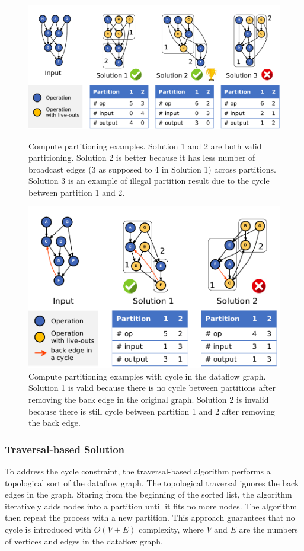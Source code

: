 \begin{figure}
  \centering
  \includegraphics[width=1\columnwidth]{figs/parteg.pdf}
  \caption[Compute partitioning examples]{
    Compute partitioning examples. Solution 1 and 2 are both valid partitioning. Solution 2 is
    better because it has less number of broadcast edges (3 as supposed to 4 in Solution 1) across partitions. 
    Solution 3 is an example
    of illegal partition result due to the cycle between partition 1 and 2.
  }
  \label{fig:parteg}

  \includegraphics[width=0.8\columnwidth]{figs/partcycleeg.pdf}
  \caption[Compute partitioning examples with cycle]{
    Compute partitioning examples with cycle in the dataflow graph.
    Solution 1 is valid because there is no 
    cycle between partitions after removing the back edge in
    the original graph.
    Solution 2 is invalid because there is still cycle between partition 1 and 2 after
    removing the back edge.
  }
  \label{fig:partcycleeg}
\end{figure}

\subsubsection{Traversal-based Solution}
To address the cycle constraint, the traversal-based algorithm performs a topological sort of the dataflow graph.
The topological traversal ignores the back edges in the graph. 
Staring from the beginning of the sorted list, the algorithm iteratively adds nodes into a partition
until it fits no more nodes. The algorithm then repeat the process with a new partition.
This approach guarantees that no cycle is introduced with $O(V+E)$ complexity, 
where $V$ and $E$ are the numbers of vertices and edges in the dataflow graph.

